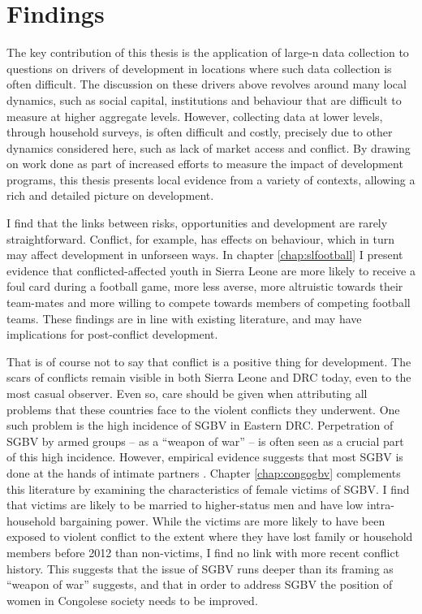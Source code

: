 \section{Findings}
The key contribution of this thesis is the application of large-n data collection to questions on drivers of development in locations where such data collection is often difficult. The discussion on these drivers above revolves around many local dynamics, such as social capital, institutions and behaviour that are difficult to measure at higher aggregate levels. However, collecting data at lower levels, through household surveys, is often difficult and costly, precisely due to other dynamics considered here, such as lack of market access and conflict. By drawing on work done as part of increased efforts to measure the impact of development programs, this thesis presents local evidence from a variety of contexts, allowing a rich and detailed picture on development.

I find that the links between risks, opportunities and development are rarely straightforward. Conflict, for example, has effects on behaviour, which in turn may affect development in unforseen ways. In chapter \ref{chap:slfootball} I present  evidence that conflicted-affected youth in Sierra Leone are more likely to receive a foul card during a football game, more less averse,  more altruistic towards their team-mates and more willing to compete towards members of competing football teams. These findings are in line with existing literature, and may have implications for post-conflict development. 

That is of course not to say that conflict is a positive thing for development. The scars of conflicts remain visible in both Sierra Leone and DRC today, even to the most casual observer. Even so, care should be given when attributing all problems that these countries face to the violent conflicts they underwent. One such problem is the high incidence of SGBV in Eastern DRC. Perpetration of SGBV by armed groups -- as a ``weapon of war'' -- is often seen as a crucial part of this high incidence. However, empirical evidence suggests that most SGBV is done at the hands of intimate partners \citep[see e.g.][]{Peterman2011}. Chapter \ref{chap:congogbv} complements this literature by examining the characteristics of female victims of SGBV. I find that victims are likely to be married to higher-status men and have low intra-household bargaining power. While the victims are more likely to have been exposed to violent conflict to the extent where they have lost family or household members before 2012 than non-victims, I find no link with more recent conflict history. This suggests that the issue of SGBV runs deeper than its framing as ``weapon of war'' suggests, and that  in order to address SGBV the position of women in Congolese society needs to be improved.

